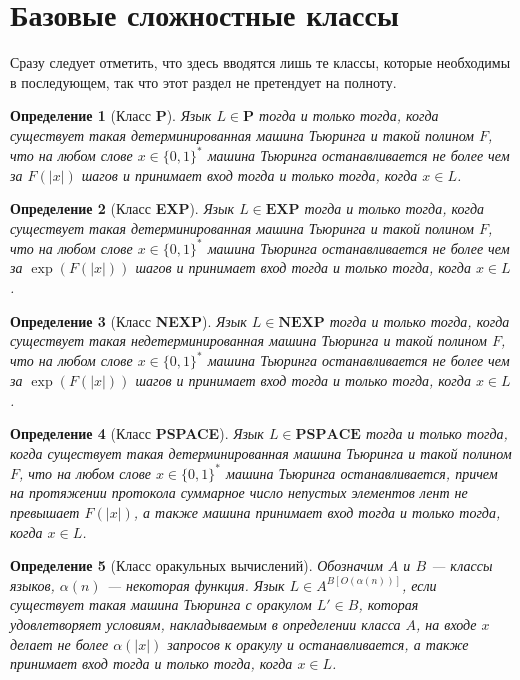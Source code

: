 \documentclass[14pt, a4paper]{extreport}
\newtheorem{definition}{\indent Определение}
\newcommand{\word}{\{0, 1\}^*}
\begin{document}
\section{Базовые сложностные классы}
Сразу следует отметить, что здесь вводятся лишь те классы, которые необходимы в последующем, так что этот раздел не претендует на полноту.
\begin{definition}[Класс \textbf{P}]Язык $L \in \textbf{P}$ тогда и только тогда, когда существует такая детерминированная машина Тьюринга и такой полином $F$, что на любом слове $x \in \word$ машина Тьюринга останавливается не более чем за $F(|x|)$ шагов и принимает вход тогда и только тогда, когда $x \in L$.
\end{definition}
\begin{definition}[Класс \textbf{EXP}]Язык $L \in \textbf{EXP}$ тогда и только тогда, когда существует такая детерминированная машина Тьюринга и такой полином $F$, что на любом слове $x \in \word$ машина Тьюринга останавливается не более чем за $\exp\left(F(|x|)\right)$ шагов и принимает вход тогда и только тогда, когда $x \in L$.
\end{definition}
\begin{definition}[Класс \textbf{NEXP}]Язык $L \in \textbf{NEXP}$ тогда и только тогда, когда существует такая недетерминированная машина Тьюринга и такой полином $F$, что на любом слове $x \in \word$ машина Тьюринга останавливается не более чем за $\exp\left(F(|x|)\right)$ шагов и принимает вход тогда и только тогда, когда $x \in L$.
\end{definition}
\begin{definition}[Класс \textbf{PSPACE}]Язык $L \in \textbf{PSPACE}$ тогда и только тогда, когда существует такая детерминированная машина Тьюринга и такой полином $F$, что на любом слове $x \in \word$ машина Тьюринга останавливается, причем на протяжении протокола суммарное число непустых элементов лент не превышает $F(|x|)$, а также машина принимает вход тогда и только тогда, когда $x \in L$.
\end{definition}
\begin{definition}[Класс оракульных вычислений]Обозначим $A$ и $B$ --- классы языков, $\alpha(n)$ --- некоторая функция. Язык $L \in A^{B\left[O(\alpha(n))\right]}$, если существует такая машина Тьюринга с оракулом $L' \in B$, которая удовлетворяет условиям, накладываемым в определении класса $A$, на входе $x$ делает не более $\alpha(|x|)$ запросов к оракулу и останавливается, а также принимает вход тогда и только тогда, когда $x \in L$.
\end{definition}
\end{document}
